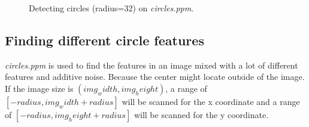 \documentclass[paper=a4, fontsize=11pt]{scrartcl}
\numberwithin{equation}{section}		%
\numberwithin{figure}{section}			%
\begin{document}
\begin{figure}[h]
\centering
{}
\caption{Detecting circles (radius=32) on \emph{circles.ppm}.}
\label{fig:hough:simple_circle}
\end{figure}

\subsection{Finding different circle features}

\emph{circles.ppm} is used to find the features in an image mixed with a lot of different features and additive noise.
Because the center might locate outside of the image.
If the image size is $ (img_width, img_height) $, a range of $ [-radius, img_width + radius] $ will be scanned for the x coordinate and a range of $ [-radius, img_height + radius ] $ will be scanned for the y coordinate.
\end{document}
